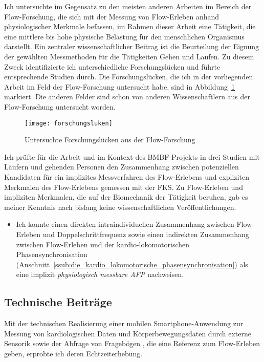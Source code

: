Ich untersuchte im Gegensatz zu den meisten anderen Arbeiten im Bereich der Flow-Forschung, die sich mit der Messung von Flow-Erleben anhand physiologischer Merkmale befassen, im Rahmen dieser Arbeit eine Tätigkeit, die eine mittlere bis hohe physische Belastung für den menschlichen Organismus darstellt. Ein zentraler wissenschaftlicher Beitrag ist die Beurteilung der Eignung der gewählten Messmethoden für die Tätigkeiten Gehen und Laufen. Zu diesem Zweck identifizierte ich unterschiedliche Forschungslücken und führte entsprechende Studien durch. Die Forschungslücken, die ich in der vorliegenden Arbeit im Feld der Flow-Forschung untersucht habe, sind in Abbildung~\ref{fig:forschungsluken} markiert. Die anderen Felder sind schon von anderen Wissenschaftlern aus der Flow-Forschung untersucht worden. 
\begin{figure}
	[!htb] \centering 
	\texttt{[image: forschungsluken]} \caption[Untersuchte Forschungslücken aus der Flow-Forschung]{Untersuchte Forschungslücken aus der Flow-Forschung} \label{fig:forschungsluken} 
\end{figure}

Ich prüfte für die Arbeit und im Kontext des \acs{BMBF}-Projekts in drei Studien mit Läufern und gehenden Personen den Zusammenhang zwischen potenziellen Kandidaten für ein implizites Messverfahren des Flow-Erlebens und expliziten Merkmalen des Flow-Erlebens gemessen mit der \ac{FKS}. Zu Flow-Erleben und impliziten Merkmalen, die auf der Biomechanik der Tätigkeit beruhen, gab es meiner Kenntnis nach bislang keine wissenschaftlichen Veröffentlichungen. 
\begin{itemize}
	
	\item Ich konnte einen direkten intraindividuellen Zusammenhang zwischen Flow-Erleben und Doppelschrittfrequenz sowie einen indirekten Zusammenhang zwischen Flow-Erleben und der kardio-lokomotorischen Phasensynchronisation (Anschnitt~\ref{ssub:die_kardio_lokomotorische_phasensynchronisation}) als eine implizit \emph{physiologisch messbare \ac{AFP}} nachweisen. 
\end{itemize}

\subsection{Technische Beiträge} 

\label{sub:technische_beitrage}

Mit der technischen Realisierung einer mobilen Smartphone-Anwendung zur Messung von kardiologischen Daten und Körperbewegungsdaten durch externe Sensorik sowie der Abfrage von Fragebögen \citep{Bogutzky2016}, die eine Referenz zum Flow-Erleben geben, erprobte ich deren Echtzeiterhebung. 


